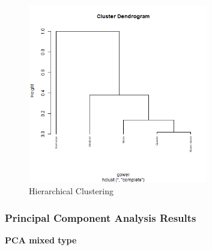 \documentclass{FR16}
\begin{document}
\begin{figure}[h]
  \centering
    \includegraphics[width=0.7\textwidth]{figures/hc3.PNG} 
 \caption{\label{fig:28} Hierarchical Clustering}
\end{figure}

\newpage
\subsubsection{Principal Component Analysis Results}

\noindent \textbf{PCA mixed type}\\
\end{document}
